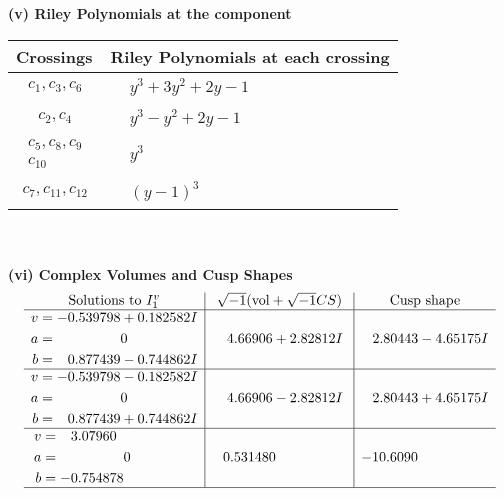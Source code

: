 \documentclass[1p]{elsarticle_modified}
\theoremstyle{definition}
\newcommand{\I}{\sqrt{-1}}
\begin{document}
\newpage\renewcommand{\arraystretch}{1}
\flushleft \textbf{(v) Riley Polynomials at the component}\newline \\
\begin{tabular}{m{50pt}|m{274pt}}
Crossings & \hspace{64pt}Riley Polynomials at each crossing \\
\hline $$\begin{aligned}c_{1},c_{3},c_{6}\end{aligned}$$&$\begin{aligned}
&y^3+3 y^2+2 y-1
\end{aligned}$\\
\hline $$\begin{aligned}c_{2},c_{4}\end{aligned}$$&$\begin{aligned}
&y^3- y^2+2 y-1
\end{aligned}$\\
\hline $$\begin{aligned}c_{5},c_{8},c_{9}\\c_{10}\end{aligned}$$&$\begin{aligned}
&y^3
\end{aligned}$\\
\hline $$\begin{aligned}c_{7},c_{11},c_{12}\end{aligned}$$&$\begin{aligned}
&(y-1)^3
\end{aligned}$\\
\hline
\end{tabular}\\~\\
\newpage\flushleft \textbf{(vi) Complex Volumes and Cusp Shapes}
$$\begin{array}{c|c|c}  
\text{Solutions to }I^v_{1}& \I (\text{vol} + \sqrt{-1}CS) & \text{Cusp shape}\\
 \hline 
\begin{aligned}
v &= -0.539798 + 0.182582 I \\
a &= \phantom{-0.000000 } 0 \\
b &= \phantom{-}0.877439 - 0.744862 I\end{aligned}
 & \phantom{-}4.66906 + 2.82812 I & \phantom{-}2.80443 - 4.65175 I \\ \hline\begin{aligned}
v &= -0.539798 - 0.182582 I \\
a &= \phantom{-0.000000 } 0 \\
b &= \phantom{-}0.877439 + 0.744862 I\end{aligned}
 & \phantom{-}4.66906 - 2.82812 I & \phantom{-}2.80443 + 4.65175 I \\ \hline\begin{aligned}
v &= \phantom{-}3.07960\phantom{ +0.000000I} \\
a &= \phantom{-0.000000 } 0 \\
b &= -0.754878\phantom{ +0.000000I}\end{aligned}
 & \phantom{-}0.531480\phantom{ +0.000000I} & -10.6090\phantom{ +0.000000I}\\
 \hline 
 \end{array}$$\newpage
\end{document}

